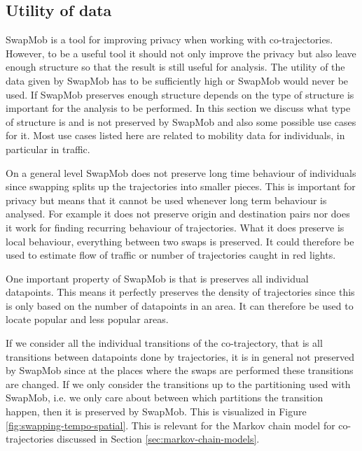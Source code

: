 \documentclass[12pt]{article}
\theoremstyle{definition}
\begin{document}
\subsection{Utility of data}
\label{sec:utility-data}
SwapMob is a tool for improving privacy when working with
co-trajectories. However, to be a useful tool it should not only
improve the privacy but also leave enough structure so that the result
is still useful for analysis. The utility of the data given by SwapMob
has to be sufficiently high or SwapMob would never be used. If SwapMob
preserves enough structure depends on the type of structure is
important for the analysis to be performed. In this section we discuss
what type of structure is and is not preserved by SwapMob and also
some possible use cases for it. Most use cases listed here are related
to mobility data for individuals, in particular in traffic.

On a general level SwapMob does not preserve long time behaviour of
individuals since swapping splits up the trajectories into smaller
pieces. This is important for privacy but means that it cannot be used
whenever long term behaviour is analysed. For example it does not
preserve origin and destination pairs nor does it work for finding
recurring behaviour of trajectories. What it does preserve is local
behaviour, everything between two swaps is preserved. It could
therefore be used to estimate flow of traffic or number of
trajectories caught in red lights.

One important property of SwapMob is that is preserves all individual
datapoints. This means it perfectly preserves the density of
trajectories since this is only based on the number of datapoints in
an area. It can therefore be used to locate popular and less popular
areas.

If we consider all the individual transitions of the co-trajectory,
that is all transitions between datapoints done by trajectories, it is
in general not preserved by SwapMob since at the places where the
swaps are performed these transitions are changed. If we only consider
the transitions up to the partitioning used with SwapMob, i.e. we only
care about between which partitions the transition happen, then it is
preserved by SwapMob. This is visualized in Figure
\ref{fig:swapping-tempo-spatial}. This is relevant for the Markov
chain model for co-trajectories discussed in Section
\ref{sec:markov-chain-models}.
\end{document}

